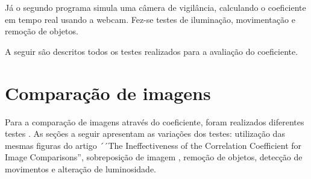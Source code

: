 \documentclass[10pt,a4paper]{article}
\begin{document}
Já o segundo programa simula uma câmera de vigilância, calculando o
coeficiente em tempo real usando a webcam. Fez-se testes de
iluminação, movimentação e remoção de objetos.

A seguir são descritos todos os testes realizados para a avaliação do coeficiente.

\newpage
\section{Comparação de imagens}

Para a comparação de imagens através do coeficiente, foram realizados diferentes testes
. As seções a seguir apresentam as variações dos testes: utilização
das mesmas figuras do artigo ´´The Ineffectiveness of the Correlation
Coefficient for Image Comparisons'', sobreposição de imagem , remoção de objetos, detecção
de movimentos e alteração de luminosidade.  
\end{document}
